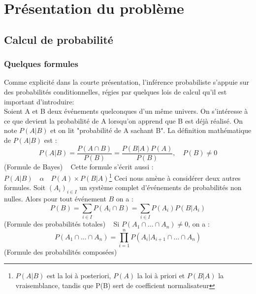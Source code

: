 \documentclass[a4paper]{article}
\begin{document}
\newpage
 \section{Présentation du problème}
  \subsection{Calcul de probabilité}
   \subsubsection{Quelques formules}
   
Comme explicité dans la courte présentation, l'inférence probabiliste s'appuie sur des probabilités conditionnelles, régies par quelques lois de calcul qu'il est important d'introduire:\\
Soient A et B deux événements quelconques d'un même univers. On s'intéresse à ce que devient la probabilité de A lorsqu'on apprend que B est déjà réalisé. On note $P(A|B)$ et on lit "probabilité de A sachant B".
La définition mathématique de $P(A|B)$ est :
$$P(A|B) = \frac{P(A\cap B)}{P(B)} = \frac{P(B|A)P(A)}{P(B)} ,\quad P(B)\ne 0$$
\hfill(Formule de Bayes)
\newline
~
\newline
Cette formule s'écrit aussi :
$P(A|B) \quad \alpha \quad P(A) \times P(B|A)$\footnote{$P(A|B)$ est la loi à posteriori, $P(A)$ la loi à priori et $P(B|A)$ la vraisemblance, tandis que P(B) sert de coefficient normalisateur}
\newline
Ceci nous amène à considérer deux autres formules.
Soit $(A_i)_{i\in I}$ un système complet d'événements de probabilités non nulles. Alors pour tout événement $B$ on a : 
$$P(B)=\sum_{i\in I} P(A_i\cap B)=\sum_{i\in I} P(A_i)P(B|A_i)$$
\hfill(Formule des probabilités totales)
\newline
~
\newline
Si $P(A_1 \cap \ldots \cap A_n) \ne 0$, on a :
$$P(A_1 \cap \ldots \cap A_n) = \prod_{i = 1}^{n} P(A_i|A_{i+1} \cap \ldots \cap A_n)$$
\hfill(Formule des probabilités composées)
\end{document}
